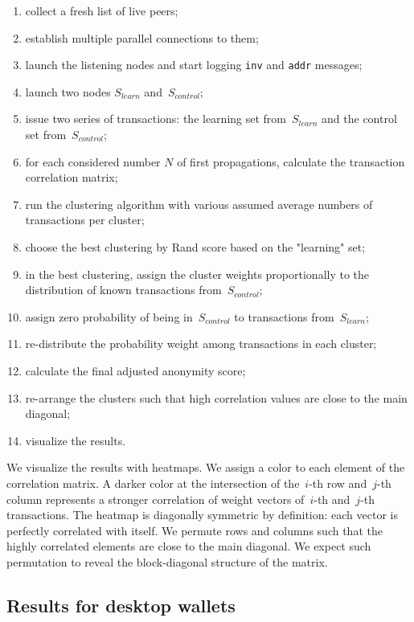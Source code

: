 \begin{enumerate}
	\item collect a fresh list of live peers;
	\item establish multiple parallel connections to them;
	\item launch the listening nodes and start logging \texttt{inv} and \texttt{addr} messages;
	\item launch two nodes $S_{learn}$ and~$S_{control}$;%
	\item issue two series of transactions: the learning set from~$S_{learn}$ and the control set from~$S_{control}$;
	\item for each considered number $N$ of first propagations, calculate the transaction correlation matrix;
	\item run the clustering algorithm with various assumed average numbers of transactions per cluster;
	\item choose the best clustering by Rand score based on the "learning" set;
	\item in the best clustering, assign the cluster weights proportionally to the distribution of known transactions from~$S_{control}$;
	\item assign zero probability of being in~$S_{control}$ to transactions from~$S_{learn}$;
	\item re-distribute the probability weight among transactions in each cluster;
	\item calculate the final adjusted anonymity score;
	\item re-arrange the clusters such that high correlation values are close to the main diagonal;
	\item visualize the results.
\end{enumerate}

We visualize the results with heatmaps.
We assign a color to each element of the correlation matrix.
A darker color at the intersection of the~$i$-th row and~$j$-th column represents a stronger correlation of weight vectors of~$i$-th and~$j$-th transactions.
The heatmap is diagonally symmetric by definition: each vector is perfectly correlated with itself.
We permute rows and columns such that the highly correlated elements are close to the main diagonal.
We expect such permutation to reveal the block-diagonal structure of the matrix.


\subsection{Results for desktop wallets}

